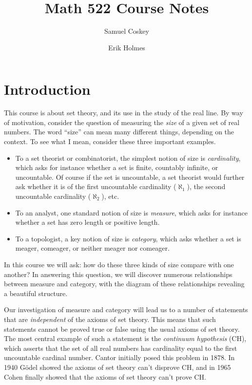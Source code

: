 \documentclass[11pt,oneside]{amsart}
\title{Math 522 Course Notes}
\author{Samuel Coskey}
\author{Erik Holmes}
\theoremstyle{definition}
\theoremstyle{definition}
\theoremstyle{remark}
\begin{document}
\maketitle

\setcounter{section}{-1}
\section{Introduction}

This course is about set theory, and its use in the study of the real line. By way of motivation, consider the question of measuring the \emph{size} of a given set of real numbers. The word ``size'' can mean many different things, depending on the context. To see what I mean, consider these three important examples.

\begin{itemize}
\item To a set theorist or combinatorist, the simplest notion of size is
\emph{cardinality}, which asks for instance whether a set is finite, countably infinite, or uncountable. Of course if the set is uncountable, a set theorist would further ask whether it is of the first uncountable cardinality ($\aleph_1$), the second uncountable cardinality ($\aleph_2$), etc.

\item To an analyst, one standard notion of size is \emph{measure}, which asks for instance whether a set has zero length or positive length.

\item To a topologist, a key notion of size is \emph{category}, which asks whether a set is meager, comeager, or neither meager nor comeager.
\end{itemize}

In this course we will ask: how do these three kinds of size compare with one another? In answering this question, we will discover numerous relationships between measure and category, with the diagram of these relationships revealing a beautiful structure.

Our investigation of measure and category will lead us to a number of statements that are \emph{independent} of the axioms of set theory. This means that such statements cannot be proved true or false using the usual axioms of set theory. The most central example of such a statement is the \emph{continuum hypothesis} (CH), which asserts that the set of all real numbers has cardinality equal to the first uncountable cardinal number. Cantor initially posed this problem in 1878. In 1940 G\"odel showed the axioms of set theory can't disprove CH, and in 1965 Cohen finally showed that the axioms of set theory can't prove CH.
\end{document}
